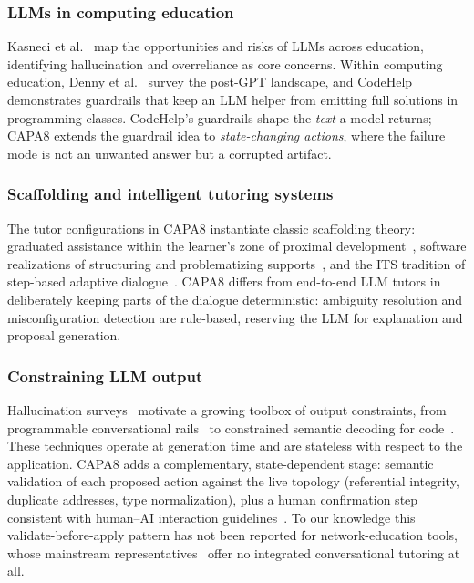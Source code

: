 \documentclass[conference,a4paper]{IEEEtran}
\begin{document}
\subsubsection*{LLMs in computing education}
Kasneci et al.~\cite{kasneci2023chatgpt} map the opportunities and risks of LLMs across education, identifying hallucination and overreliance as core concerns. Within computing education, Denny et al.~\cite{denny2024computing} survey the post-GPT landscape, and CodeHelp~\cite{liffiton2023codehelp} demonstrates guardrails that keep an LLM helper from emitting full solutions in programming classes. CodeHelp's guardrails shape the \emph{text} a model returns; CAPA8 extends the guardrail idea to \emph{state-changing actions}, where the failure mode is not an unwanted answer but a corrupted artifact.

\subsubsection*{Scaffolding and intelligent tutoring systems}
The tutor configurations in CAPA8 instantiate classic scaffolding theory: graduated assistance within the learner's zone of proximal development~\cite{vygotsky1978mind,wood1976role}, software realizations of structuring and problematizing supports~\cite{reiser2004scaffolding}, and the ITS tradition of step-based adaptive dialogue~\cite{vanlehn2011relative}. CAPA8 differs from end-to-end LLM tutors in deliberately keeping parts of the dialogue deterministic: ambiguity resolution and misconfiguration detection are rule-based, reserving the LLM for explanation and proposal generation.

\subsubsection*{Constraining LLM output}
Hallucination surveys~\cite{ji2023survey} motivate a growing toolbox of output constraints, from programmable conversational rails~\cite{rebedea2023nemo} to constrained semantic decoding for code~\cite{poesia2022synchromesh}. These techniques operate at generation time and are stateless with respect to the application. CAPA8 adds a complementary, state-dependent stage: semantic validation of each proposed action against the live topology (referential integrity, duplicate addresses, type normalization), plus a human confirmation step consistent with human--AI interaction guidelines~\cite{amershi2019guidelines}. To our knowledge this validate-before-apply pattern has not been reported for network-education tools, whose mainstream representatives~\cite{packettracer,lantz2010mininet,kurose2021computer} offer no integrated conversational tutoring at all.
\end{document}

